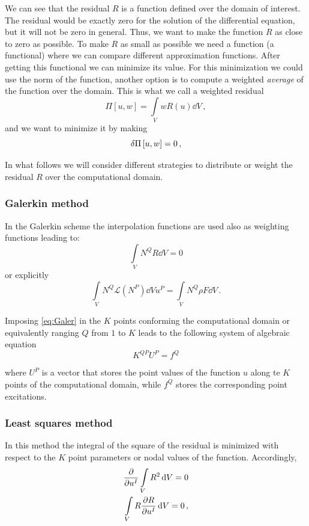 We can see that the residual $R$ is a function defined over the domain of interest. The residual would be exactly zero for the solution of the differential equation, but it will not be zero in general. Thus, we want to make the function $R$ as close to zero as possible. To make $R$ as small as possible we need a function (a functional) where we can compare different approximation functions. After getting this functional we can minimize its value. For this minimization we could use the norm of the function, another option is to compute a weighted \emph{average} of the function over the domain. This is what we call a weighted residual
\[\Pi[u, w] = \int\limits_V w R(u) \dd{V}\, ,\]
and we want to minimize it by making
\[\var{\Pi}[u, w] = 0\, ,\]

In what follows we will consider different strategies to distribute or weight the residual $R$ over the computational domain.

\subsubsection{Galerkin method}
In the Galerkin scheme the interpolation functions are used also as weighting functions leading to:
\[\int\limits_V N^Q R\dd{V} = 0 \]
or explicitly
\begin{equation}
  \int\limits_V N^Q \mathcal{L} (N^P)\dd{V} u^P = \int\limits_V N^Q\rho F\dd{V}\, .
  \label{eq:Galer}
\end{equation}

Imposing \cref{eq:Galer} in the $K$ points conforming the computational domain or equivalently ranging $Q$ from $1$ to $K$ leads to the following system of algebraic equation
\begin{equation}
{K^{QP}}{U^P} = {f^Q}
\label{eq:DGaler}
\end{equation}

where $U^P$ is a vector that stores the point values of the function $u$ along te $K$ points of the computational domain, while $f^Q$ stores the corresponding point excitations.

\subsubsection{Least squares method}
In this method the integral of the square of the residual is minimized with respect to the $K$ point parameters or nodal values of the function. Accordingly,
\begin{align*}
  &\pdv{u^I}\int\limits_V R^2 \dd{V} = 0\\
  &\int\limits_V R \pdv{R}{u^I} \dd{V} = 0\, ,
\end{align*}

